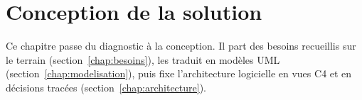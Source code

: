 \chapter{Conception de la solution}
\label{chap:conception}

Ce chapitre passe du diagnostic à la conception. Il part des besoins recueillis sur le terrain (section~\ref{chap:besoins}), les traduit en modèles UML (section~\ref{chap:modelisation}), puis fixe l'architecture logicielle en vues C4 et en décisions tracées (section~\ref{chap:architecture}).





